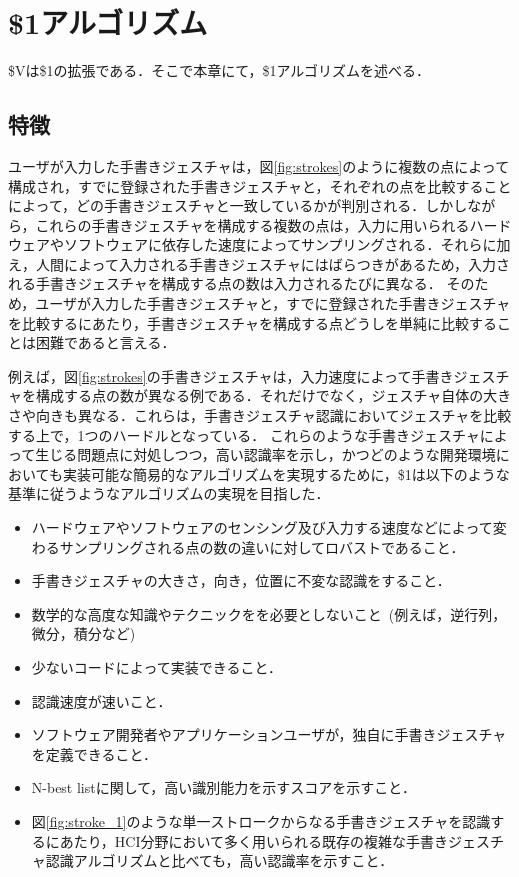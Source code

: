 \chapter{\$1アルゴリズム}
\$Vは\$1の拡張である．そこで本章にて，\$1アルゴリズムを述べる．

\section{特徴}
ユーザが入力した手書きジェスチャは，図\ref{fig:strokes}のように複数の点によって構成され，すでに登録された手書きジェスチャと，それぞれの点を比較することによって，どの手書きジェスチャと一致しているかが判別される．しかしながら，これらの手書きジェスチャを構成する複数の点は，入力に用いられるハードウェアやソフトウェアに依存した速度によってサンプリングされる．それらに加え，人間によって入力される手書きジェスチャにはばらつきがあるため，入力される手書きジェスチャを構成する点の数は入力されるたびに異なる．
そのため，ユーザが入力した手書きジェスチャと，すでに登録された手書きジェスチャを比較するにあたり，手書きジェスチャを構成する点どうしを単純に比較することは困難であると言える．


例えば，図\ref{fig:strokes}の手書きジェスチャは，入力速度によって手書きジェスチャを構成する点の数が異なる例である．それだけでなく，ジェスチャ自体の大きさや向きも異なる．これらは，手書きジェスチャ認識においてジェスチャを比較する上で，1つのハードルとなっている．
これらのような手書きジェスチャによって生じる問題点に対処しつつ，高い認識率を示し，かつどのような開発環境においても実装可能な簡易的なアルゴリズムを実現するために，\$1は以下のような基準に従うようなアルゴリズムの実現を目指した．

\begin{itemize}
\item ハードウェアやソフトウェアのセンシング及び入力する速度などによって変わるサンプリングされる点の数の違いに対してロバストであること．
\item 手書きジェスチャの大きさ，向き，位置に不変な認識をすること．
\item 数学的な高度な知識やテクニックをを必要としないこと~(例えば，逆行列，微分，積分など)
\item 少ないコードによって実装できること．
\item 認識速度が速いこと．
\item ソフトウェア開発者やアプリケーションユーザが，独自に手書きジェスチャを定義できること．
\item N-best listに関して，高い識別能力を示すスコアを示すこと．
\item 図\ref{fig:stroke_1}のような単一ストロークからなる手書きジェスチャを認識するにあたり，HCI分野において多く用いられる既存の複雑な手書きジェスチャ認識アルゴリズムと比べても，高い認識率を示すこと．
\end{itemize}

